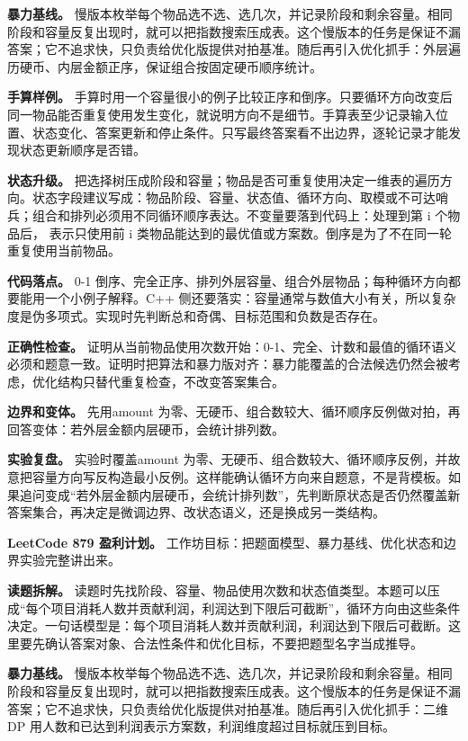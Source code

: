 \textbf{暴力基线。} 慢版本枚举每个物品选不选、选几次，并记录阶段和剩余容量。相同阶段和容量反复出现时，就可以把指数搜索压成表。这个慢版本的任务是保证不漏答案；它不追求快，只负责给优化版提供对拍基准。随后再引入优化抓手：外层遍历硬币、内层金额正序，保证组合按固定硬币顺序统计。

\textbf{手算样例。} 手算时用一个容量很小的例子比较正序和倒序。只要循环方向改变后同一物品能否重复使用发生变化，就说明方向不是细节。手算表至少记录输入位置、状态变化、答案更新和停止条件。只写最终答案看不出边界，逐轮记录才能发现状态更新顺序是否错。

\textbf{状态升级。} 把选择树压成阶段和容量；物品是否可重复使用决定一维表的遍历方向。状态字段建议写成：物品阶段、容量、状态值、循环方向、取模或不可达哨兵；组合和排列必须用不同循环顺序表达。不变量要落到代码上：处理到第 i 个物品后， 表示只使用前 i 类物品能达到的最优值或方案数。倒序是为了不在同一轮重复使用当前物品。

\textbf{代码落点。} 0-1 倒序、完全正序、排列外层容量、组合外层物品；每种循环方向都要能用一个小例子解释。C++ 侧还要落实：容量通常与数值大小有关，所以复杂度是伪多项式。实现时先判断总和奇偶、目标范围和负数是否存在。

\textbf{正确性检查。} 证明从当前物品使用次数开始：0-1、完全、计数和最值的循环语义必须和题意一致。证明时把算法和暴力版对齐：暴力能覆盖的合法候选仍然会被考虑，优化结构只替代重复检查，不改变答案集合。

\textbf{边界和变体。} 先用amount 为零、无硬币、组合数较大、循环顺序反例做对拍，再回答变体：若外层金额内层硬币，会统计排列数。

\textbf{实验复盘。} 实验时覆盖amount 为零、无硬币、组合数较大、循环顺序反例，并故意把容量方向写反构造最小反例。这样能确认循环方向来自题意，不是背模板。如果追问变成“若外层金额内层硬币，会统计排列数”，先判断原状态是否仍然覆盖新答案集合，再决定是微调边界、改状态语义，还是换成另一类结构。

\noindent\textbf{LeetCode 879 盈利计划。} 工作坊目标：把题面模型、暴力基线、优化状态和边界实验完整讲出来。

\textbf{读题拆解。} 读题时先找阶段、容量、物品使用次数和状态值类型。本题可以压成“每个项目消耗人数并贡献利润，利润达到下限后可截断”，循环方向由这些条件决定。一句话模型是：每个项目消耗人数并贡献利润，利润达到下限后可截断。这里要先确认答案对象、合法性条件和优化目标，不要把题型名字当成推导。

\textbf{暴力基线。} 慢版本枚举每个物品选不选、选几次，并记录阶段和剩余容量。相同阶段和容量反复出现时，就可以把指数搜索压成表。这个慢版本的任务是保证不漏答案；它不追求快，只负责给优化版提供对拍基准。随后再引入优化抓手：二维 DP 用人数和已达到利润表示方案数，利润维度超过目标就压到目标。

